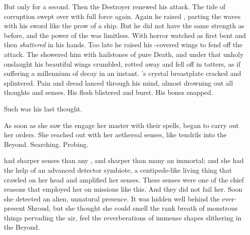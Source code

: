 But only for a second. 
Then the Destroyer renewed his attack. 
The tide of corruption swept over \Teshrial with full force again. 
Again he raised \Turishah, parting the waves with his sword like the prow of a ship. 
But he did not have the same strength as before, and the power of the \xs \KhothSell was limitless. 
With horror \Teshrial watched as \Turishah first bent and then \emph{shattered} in his hands. 
Too late he raised his \kilghan-covered wings to fend off the attack.
The \xs showered him with hailstones of pure Death, and under that unholy onslaught his beautiful wings crumbled, rotted away and fell off in tatters, as if suffering a millennium of decay in an instant. 
\Teshrial's crystal breastplate cracked and splintered. 
Pain and dread lanced through his mind, almost drowning out all thoughts and senses.
His flesh blistered and burst. 
His bones snapped. 

Such was his last thought. 



\begin{comment}
  \subsection{Criseis feels}
\end{comment}
\new
As soon as she saw the \resphain engage her master with their spells, \Criseis began to carry out her orders.
She reached out with her aethereal senses, like tendrils into the Beyond. 
Searching. Probing. 


\Criseis had sharper senses than any \scatha, and sharper than many an immortal; and she had the help of an advanced detector symbiote, a centipede-like living thing that crawled on her head and amplified her senses. 
These senses were one of the chief reasons that \Ishnaruchaefir employed her on missions like this. 
And they did not fail her. 
Soon she detected an alien, unnatural presence. 
It was hidden well behind the ever-present Shroud, but she thought she could smell the rank breath of monstrous things pervading the air, feel the reverberations of immense shapes slithering in the Beyond. 

